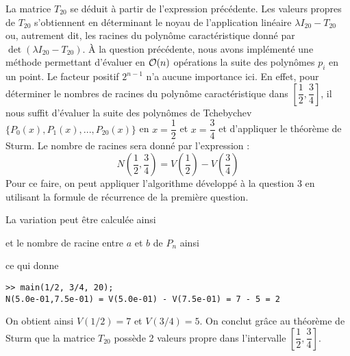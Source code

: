 La matrice $T_{20}$ se déduit à partir de l'expression précédente.
Les valeurs propres de $T_{20}$ s'obtiennent en déterminant le noyau
de l'application linéaire $\lambda I_{20} - T_{20}$ ou,
autrement dit, les racines du polynôme caractéristique donné par
$\det(\lambda I_{20} - T_{20})$.
À la question précédente, nous avons implémenté une méthode permettant
d'évaluer en $\mathcal{O}(n)$ opérations la suite des polynômes $p_i$ en un point.
Le facteur positif $2^{n-1}$ n'a aucune importance ici. En effet, pour déterminer le nombres de racines du polynôme caractéristique dans $\left[ \dfrac{1}{2} , \dfrac{3}{4} \right]$, il nous suffit d'évaluer la suite des polynômes de Tchebychev $ \{ P_0(x), P_1(x), ... , P_{20}(x) \}$ en $x=\dfrac{1}{2}$ et $x=\dfrac{3}{4}$ et d'appliquer le théorème de Sturm. Le nombre de racines sera donné par l'expression :
$$N(\dfrac{1}{2} , \dfrac{3}{4}) = V(\dfrac{1}{2}) - V(\dfrac{3}{4})$$
Pour ce faire, on peut appliquer l'algorithme développé à la question 3 en utilisant la formule de récurrence de la première question.

La variation peut être calculée ainsi

et le nombre de racine entre $a$ et $b$ de $P_n$ ainsi

ce qui donne
\begin{lstlisting}
>> main(1/2, 3/4, 20);
N(5.0e-01,7.5e-01) = V(5.0e-01) - V(7.5e-01) = 7 - 5 = 2
\end{lstlisting}

On obtient ainsi $V(1/2) = 7$ et $V(3/4) = 5$.
On conclut grâce au théorème de Sturm que la matrice $T_{20}$
possède 2 valeurs propre dans l'intervalle
$\left[ \dfrac{1}{2} , \dfrac{3}{4} \right]$.

